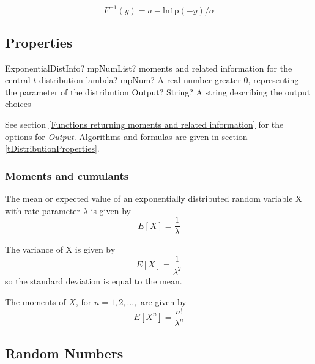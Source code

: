 \vspace{0.3cm}
\begin{equation} 
	F^{-1}(y)=a- \text{ln1p}(-y)/\alpha
\end{equation}



\subsection{Properties}
\label{ExponentialDistributionProperties}


\begin{mpFunctionsExtract}
	\mpFunctionTwoNotImplemented
	{ExponentialDistInfo? mpNumList? moments and related information for the central $t$-distribution}
	{lambda? mpNum? A real number greater 0, representing the parameter of the distribution}
	{Output? String? A string describing the output choices}
\end{mpFunctionsExtract}

\vspace{0.3cm}

See section \ref{Functions returning moments and related information} for the options for {\itshape\sffamily Output}. Algorithms and formulas are given in section \ref{tDistributionProperties}.




\subsubsection{Moments and cumulants}
The mean or expected value of an exponentially distributed random variable X with rate parameter $\lambda$ is given by
\begin{equation} 
	E[X]=\frac{1}{\lambda}
\end{equation}

The variance of X is given by
\begin{equation} 
	E[X]=\frac{1}{\lambda^2}
\end{equation}
so the standard deviation is equal to the mean.

The moments of $X$, for $n = 1, 2, ...,$ are given by
\begin{equation} 
	E[X^n]=\frac{n!}{\lambda^n}
\end{equation}



\subsection{Random Numbers}

